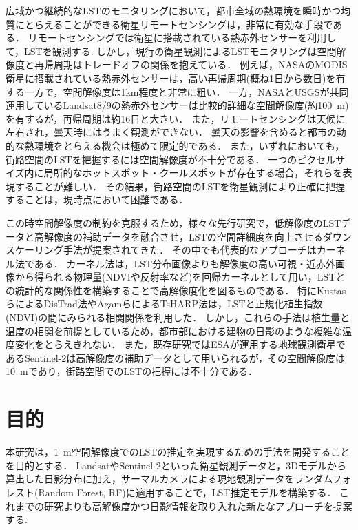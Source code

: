 \documentclass[12pt,epsf]{jreport}
\begin{document}
 広域かつ継続的なLSTのモニタリングにおいて，都市全域の熱環境を瞬時かつ均質にとらえることができる衛星リモートセンシングは，非常に有効な手段である\cite{voogt2003thermal}．
 リモートセンシングでは衛星に搭載されている熱赤外センサーを利用して，LSTを観測する.
 しかし，現行の衛星観測によるLSTモニタリングは空間解像度と再帰周期はトレードオフの関係を抱えている．
 例えば，NASAのMODIS衛星に搭載されている熱赤外センサーは，高い再帰周期(概ね1日から数日)を有する一方で，空間解像度は1km程度と非常に粗い\cite{wan2008new}．
 一方，NASAとUSGSが共同運用しているLandsat8/9の熱赤外センサーは比較的詳細な空間解像度(約100~m)を有するが，再帰周期は約16日と大きい．
 また，リモートセンシングは天候に左右され，曇天時にはうまく観測ができない．
 曇天の影響を含めると都市の動的な熱環境をとらえる機会は極めて限定的である\cite{reuter2015thermal}．
 また，いずれにおいても，街路空間のLSTを把握するには空間解像度が不十分である．
 一つのピクセルサイズ内に局所的なホットスポット・クールスポットが存在する場合，それらを表現することが難しい\cite{weng2009thermal}．
 その結果，街路空間のLSTを衛星観測により正確に把握することは，現時点において困難である．

 この時空間解像度の制約を克服するため，様々な先行研究で，低解像度のLSTデータと高解像度の補助データを融合させ，LSTの空間詳細度を向上させるダウンスケーリング手法が提案されてきた．\cite{mao2021resolution}
 その中でも代表的なアプローチはカーネル法である．
 カーネル法は，LST分布画像よりも解像度の高い可視・近赤外画像から得られる物理量(NDVIや反射率など)を回帰カーネルとして用い，LSTとの統計的な関係性を構築することで高解像度化を図るものである\cite{mao2021resolution}．
 特にKustasらによるDisTrad法\cite{kustas2003estimating}やAgamらによるTsHARP法\cite{agam2007vegetation}は，LSTと正規化植生指数(NDVI)の間にみられる相関関係を利用した．
 しかし，これらの手法は植生量と温度の相関を前提としているため，都市部における建物の日影のような複雑な温度変化をとらえきれない．
 また，既存研究ではESAが運用する地球観測衛星であるSentinel-2は高解像度の補助データとして用いられるが，その空間解像度は10~mであり，街路空間でのLSTの把握には不十分である\cite{xu2021spatial}．
 


 \section{目的}
 本研究は，1~m空間解像度でのLSTの推定を実現するための手法を開発することを目的とする．
 LandsatやSentinel-2といった衛星観測データと，3Dモデルから算出した日影分布に加え，サーマルカメラによる現地観測データをランダムフォレスト(Random Forest, RF)に適用することで，LST推定モデルを構築する．
 これまでの研究よりも高解像度かつ日影情報を取り入れた新たなアプローチを提案する.
 
\end{document}
